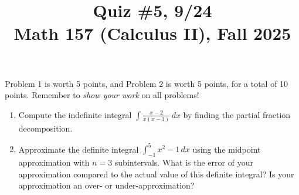 \documentclass[11pt]{article}
\title{Quiz \#5, 9/24 \\ Math 157 (Calculus II), Fall 2025}
\date{}
\begin{document}
\maketitle

\thispagestyle{empty}

\vspace{-2cm}

Problem 1 is worth 5 points, and Problem 2 is worth 5 points, for a total of 10 points. Remember to \emph{show your work} on all problems!

\begin{enumerate}
\item Compute the indefinite integral $\displaystyle \int \frac{x-2}{x(x-1)} \, dx$ by finding the partial fraction decomposition.

\vspace{7.5cm}

\item Approximate the definite integral $\displaystyle \int_{-1}^{5} x^2 - 1 \, dx$ using the midpoint approximation with $n=3$ subintervals. What is the error of your approximation compared to the actual value of this definite integral? Is your approximation an over- or under-approximation?

\end{enumerate}
\end{document}
